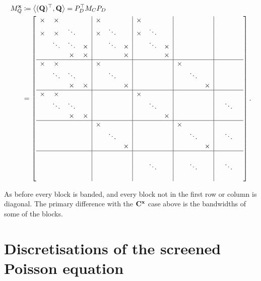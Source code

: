 \documentclass[hidelinks,onefignum,onetabnum]{siamart220329}
\def\bfC{{\bf C}}
\def\bfx{{\bf x}}
\def\bfQ{{\bf Q}}
\def\ip<#1>{\left\langle{#1}\right\rangle}
\begin{document}
\begin{align*}
M_Q^\bfx &\coloneqq  \ip<(\bfQ)^\top, \bfQ> = P_D^\top  M_C P_D \\
&= \left[\begin{array}{c c c c | c c c | c c c | c c c | c c c}
\times & \times &    &        & \times &   &         & \times &   &    &&&\\
\times & \times & \ddots &         & \times & \ddots &         & \times & \ddots &    &&&\\
  & \ddots & \ddots & \times       &   & \ddots & \times       &   & \ddots & \times  &&&\\
  &    & \times & \times      &   &    & \times       &   &    & \times  &&&\\
  \hline
  \times & \times &    &       & \times &   &     &&&    & \times &   &   \\
    & \ddots & \ddots &        &   & \ddots &    &&&     &  & \ddots &   \\
     &   & \times & \times      &   &   & \times  &&&     &   &  & \times \\
	 \hline
	 \times & \times &    &  &&&     & \times &   &     &&&    &  &   &   \\
	 & \ddots & \ddots &     &&&   &   & \ddots &    &&&     &  & \ddots &   \\
	  &   & \times & \times  &&&    &   &   & \times  &&&     &   &  &  \\
	  \hline
	    &&&     & \times &   &     &&&    & \times &   &     &  &   &   \\
	  &&&   &   & \ddots &    &&&     &  & \ddots &     &  & \ddots &   \\
	   &&&    &   &   & \times  &&&     &   &  & \times    &   &  &  \\
	   \hline 
	   &&&     &  &   &     &&&    &  &   &     &  &   &   \\
	   &&&   &   &  &    && \ddots &     &  & \ddots &     &  & \ddots &   \\
		&&&    &   &   &   &&&     &   &  &     &   &  &  \\	   
\end{array}\right].
\end{align*}



As before every block is banded, and every block not in the first row or column is diagonal.  The primary difference with the $\bfC^\bfx$ case above is the bandwidths of some of the blocks. 


\section{Discretisations of the screened Poisson equation}\label{Section:Discretisation}
\end{document}
